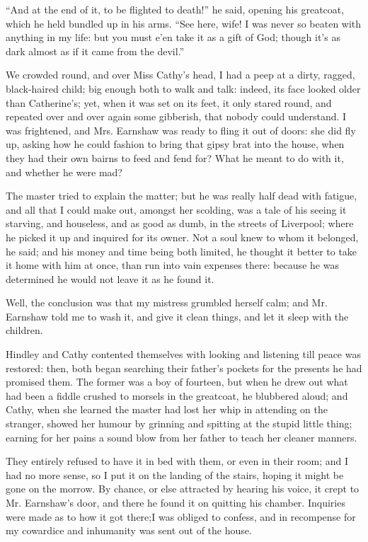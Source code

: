 \par “And at the end of it, to be flighted to death!” he said, opening his greatcoat, which he held bundled up in his arms. “See here, wife! I was never so beaten with anything in my life: but you must e'en take it as a gift of God; though it's as dark almost as if it came from the devil.”
\par We crowded round, and over Miss Cathy's head, I had a peep at a dirty, ragged, black-haired child; big enough both to walk and talk: indeed, its face looked older than Catherine's; yet, when it was set on its feet, it only stared round, and repeated over and over again some gibberish, that nobody could understand. I was frightened, and Mrs. Earnshaw was ready to fling it out of doors: she did fly up, asking how he could fashion to bring that gipsy brat into the house, when they had their own bairns to feed and fend for? What he meant to do with it, and whether he were mad?
\par The master tried to explain the matter; but he was really half dead with fatigue, and all that I could make out, amongst her scolding, was a tale of his seeing it starving, and houseless, and as good as dumb, in the streets of Liverpool; where he picked it up and inquired for its owner. Not a soul knew to whom it belonged, he said; and his money and time being both limited, he thought it better to take it home with him at once, than run into vain expenses there: because he was determined he would not leave it as he found it.
\par Well, the conclusion was that my mistress grumbled herself calm; and Mr. Earnshaw told me to wash it, and give it clean things, and let it sleep with the children.
\par Hindley and Cathy contented themselves with looking and listening till peace was restored: then, both began searching their father's pockets for the presents he had promised them. The former was a boy of fourteen, but when he drew out what had been a fiddle crushed to morsels in the greatcoat, he blubbered aloud; and Cathy, when she learned the master had lost her whip in attending on the stranger, showed her humour by grinning and spitting at the stupid little thing; earning for her pains a sound blow from her father to teach her cleaner manners.
\par They entirely refused to have it in bed with them, or even in their room; and I had no more sense, so I put it on the landing of the stairs, hoping it might be gone on the morrow. By chance, or else attracted by hearing his voice, it crept to Mr. Earnshaw's door, and there he found it on quitting his chamber. Inquiries were made as to how it got there;I was obliged to confess, and in recompense for my cowardice and inhumanity was sent out of the house.
